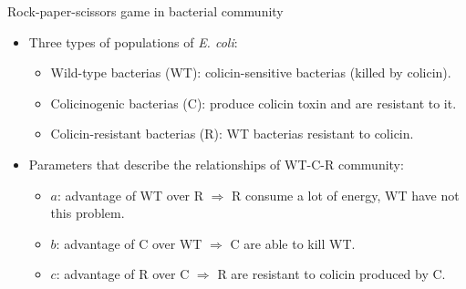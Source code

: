 \begin{frame}{Rock-paper-scissors game in bacterial community}
    \begin{itemize}
		\item Three types of populations of \textit{E. coli}: 
		\begin{itemize}
			\item Wild-type bacterias (WT): colicin-sensitive bacterias (killed by colicin). 
			\item Colicinogenic bacterias (C): produce colicin toxin and are resistant to it.
			\item Colicin-resistant bacterias (R): WT bacterias resistant to colicin.
		\end{itemize}
		\item Parameters that describe the relationships of WT-C-R community:
		\begin{itemize}
			\item $a$: advantage of WT over R $\Rightarrow$ R consume a lot of energy, WT have not this problem.
			\item $b$: advantage of C over WT $\Rightarrow$ C are able to kill WT.
			\item $c$: advantage of R over C $\Rightarrow$ R are resistant to colicin produced by C. 
		\end{itemize}
		
    \end{itemize}
\end{frame}

